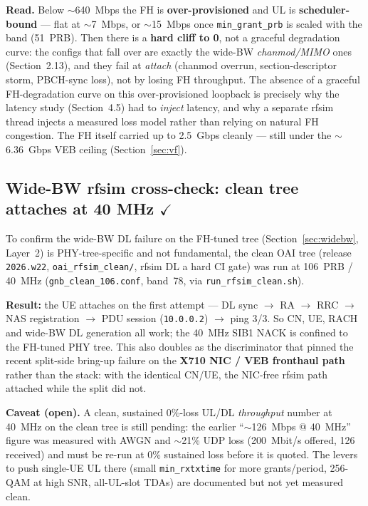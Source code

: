 \documentclass[11pt,a4paper]{article}
\newcommand{\yes}{\textcolor{closedcol}{\ensuremath{\checkmark}}}
\begin{document}
\textbf{Read.} Below $\sim$640~Mbps the FH is \textbf{over-provisioned} and UL is
\textbf{scheduler-bound} --- flat at $\sim$7~Mbps, or $\sim$15~Mbps once \texttt{min\_grant\_prb}
is scaled with the band (51~PRB). Then there is a \textbf{hard cliff to 0}, not a graceful
degradation curve: the configs that fall over are exactly the wide-BW \emph{chanmod/MIMO}
ones (Section~2.13), and they fail at \emph{attach} (chanmod overrun, section-descriptor storm,
PBCH-sync loss), not by losing FH throughput. The absence of a graceful FH-degradation curve
on this over-provisioned loopback is precisely why the latency study (Section~4.5) had to
\emph{inject} latency, and why a separate rfsim thread injects a measured loss model rather
than relying on natural FH congestion. The FH itself carried up to 2.5~Gbps cleanly --- still
under the $\sim$6.36~Gbps VEB ceiling (Section~\ref{sec:vf}).

\subsection{Wide-BW rfsim cross-check: clean tree attaches at 40 MHz
  \texorpdfstring{\yes}{[OK]}}
\label{sec:rfsimresult}

To confirm the wide-BW DL failure on the FH-tuned tree (Section~\ref{sec:widebw}, Layer~2) is
PHY-tree-specific and not fundamental, the clean OAI tree (release \texttt{2026.w22},
\texttt{oai\_rfsim\_clean/}, rfsim DL a hard CI gate) was run at 106~PRB / 40~MHz
(\texttt{gnb\_clean\_106.conf}, band~78, via \texttt{run\_rfsim\_clean.sh}).

\textbf{Result:} the UE attaches on the first attempt --- DL sync $\rightarrow$ RA
$\rightarrow$ RRC $\rightarrow$ NAS registration $\rightarrow$ PDU session (\texttt{10.0.0.2})
$\rightarrow$ ping 3/3. So CN, UE, RACH and wide-BW DL generation all work; the 40~MHz SIB1
NACK is confined to the FH-tuned PHY tree. This also doubles as the discriminator that pinned
the recent split-side bring-up failure on the \textbf{X710 NIC / VEB fronthaul path} rather
than the stack: with the identical CN/UE, the NIC-free rfsim path attached while the split did
not.

\textbf{Caveat (open).} A clean, sustained 0\%-loss UL/DL \emph{throughput} number at 40~MHz on
the clean tree is still pending: the earlier ``$\sim$126~Mbps @ 40~MHz'' figure was measured
with AWGN and $\sim$21\% UDP loss (200~Mbit/s offered, 126 received) and must be re-run at 0\%
sustained loss before it is quoted. The levers to push single-UE UL there (small
\texttt{min\_rxtxtime} for more grants/period, 256-QAM at high SNR, all-UL-slot TDAs) are
documented but not yet measured clean.
\end{document}
